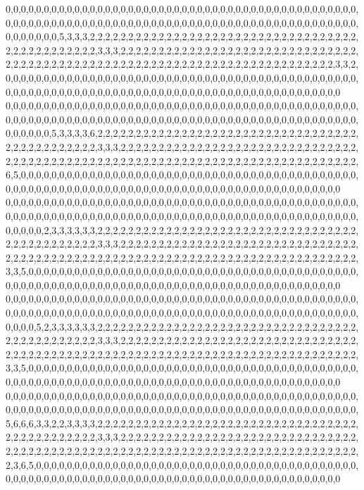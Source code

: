 0,0,0,0,0,0,0,0,0,0,0,0,0,0,0,0,0,0,0,0,0,0,0,0,0,0,0,0,0,0,0,0,0,0,0,0,0,0,0,0,0,0,0,0,0,0,0,0,0,0,0,0,0,0,0,0,0,0,0,0,0,0,0,0,0,0,0,0,0,0,0,0,0,0,0,0,0,0,0,0,0,0,0,0,0,0,0,0,0,0,0,0,0,0,0,0,0,0,0,5,3,3,3,2,2,2,2,2,2,2,2,2,2,2,2,2,2,2,2,2,2,2,2,2,2,2,2,2,2,2,2,2,2,2,2,2,2,2,2,2,2,2,2,2,2,2,2,2,2,2,3,3,3,2,2,2,2,2,2,2,2,2,2,2,2,2,2,2,2,2,2,2,2,2,2,2,2,2,2,2,2,2,2,2,2,2,2,2,2,2,2,2,2,2,2,2,2,2,2,2,2,2,2,2,2,2,2,2,2,2,2,2,2,2,2,2,2,2,2,2,2,2,2,2,2,2,2,3,3,2,0,0,0,0,0,0,0,0,0,0,0,0,0,0,0,0,0,0,0,0,0,0,0,0,0,0,0,0,0,0,0,0,0,0,0,0,0,0,0,0,0,0,0,0,0,0,0,0,0,0,0,0,0,0,0,0,0,0,0,0,0,0,0,0,0,0,0,0,0,0,0,0,0,0,0,0,0,0,0,0,0,0,0,0,0,0,0,0,0,0
0,0,0,0,0,0,0,0,0,0,0,0,0,0,0,0,0,0,0,0,0,0,0,0,0,0,0,0,0,0,0,0,0,0,0,0,0,0,0,0,0,0,0,0,0,0,0,0,0,0,0,0,0,0,0,0,0,0,0,0,0,0,0,0,0,0,0,0,0,0,0,0,0,0,0,0,0,0,0,0,0,0,0,0,0,0,0,0,0,0,0,0,0,0,0,0,0,0,5,3,3,3,3,6,2,2,2,2,2,2,2,2,2,2,2,2,2,2,2,2,2,2,2,2,2,2,2,2,2,2,2,2,2,2,2,2,2,2,2,2,2,2,2,2,2,2,2,2,2,2,3,3,3,2,2,2,2,2,2,2,2,2,2,2,2,2,2,2,2,2,2,2,2,2,2,2,2,2,2,2,2,2,2,2,2,2,2,2,2,2,2,2,2,2,2,2,2,2,2,2,2,2,2,2,2,2,2,2,2,2,2,2,2,2,2,2,2,2,2,2,2,2,2,2,2,2,2,2,2,2,6,5,0,0,0,0,0,0,0,0,0,0,0,0,0,0,0,0,0,0,0,0,0,0,0,0,0,0,0,0,0,0,0,0,0,0,0,0,0,0,0,0,0,0,0,0,0,0,0,0,0,0,0,0,0,0,0,0,0,0,0,0,0,0,0,0,0,0,0,0,0,0,0,0,0,0,0,0,0,0,0,0,0,0,0,0,0,0,0,0
0,0,0,0,0,0,0,0,0,0,0,0,0,0,0,0,0,0,0,0,0,0,0,0,0,0,0,0,0,0,0,0,0,0,0,0,0,0,0,0,0,0,0,0,0,0,0,0,0,0,0,0,0,0,0,0,0,0,0,0,0,0,0,0,0,0,0,0,0,0,0,0,0,0,0,0,0,0,0,0,0,0,0,0,0,0,0,0,0,0,0,0,0,0,0,0,0,2,3,3,3,3,3,3,2,2,2,2,2,2,2,2,2,2,2,2,2,2,2,2,2,2,2,2,2,2,2,2,2,2,2,2,2,2,2,2,2,2,2,2,2,2,2,2,2,2,2,2,2,2,3,3,3,2,2,2,2,2,2,2,2,2,2,2,2,2,2,2,2,2,2,2,2,2,2,2,2,2,2,2,2,2,2,2,2,2,2,2,2,2,2,2,2,2,2,2,2,2,2,2,2,2,2,2,2,2,2,2,2,2,2,2,2,2,2,2,2,2,2,2,2,2,2,2,2,2,2,2,2,2,3,3,5,0,0,0,0,0,0,0,0,0,0,0,0,0,0,0,0,0,0,0,0,0,0,0,0,0,0,0,0,0,0,0,0,0,0,0,0,0,0,0,0,0,0,0,0,0,0,0,0,0,0,0,0,0,0,0,0,0,0,0,0,0,0,0,0,0,0,0,0,0,0,0,0,0,0,0,0,0,0,0,0,0,0,0,0,0,0,0
0,0,0,0,0,0,0,0,0,0,0,0,0,0,0,0,0,0,0,0,0,0,0,0,0,0,0,0,0,0,0,0,0,0,0,0,0,0,0,0,0,0,0,0,0,0,0,0,0,0,0,0,0,0,0,0,0,0,0,0,0,0,0,0,0,0,0,0,0,0,0,0,0,0,0,0,0,0,0,0,0,0,0,0,0,0,0,0,0,0,0,0,0,0,0,0,5,2,3,3,3,3,3,3,2,2,2,2,2,2,2,2,2,2,2,2,2,2,2,2,2,2,2,2,2,2,2,2,2,2,2,2,2,2,2,2,2,2,2,2,2,2,2,2,2,2,2,2,2,2,3,3,3,2,2,2,2,2,2,2,2,2,2,2,2,2,2,2,2,2,2,2,2,2,2,2,2,2,2,2,2,2,2,2,2,2,2,2,2,2,2,2,2,2,2,2,2,2,2,2,2,2,2,2,2,2,2,2,2,2,2,2,2,2,2,2,2,2,2,2,2,2,2,2,2,2,2,2,2,2,3,3,5,0,0,0,0,0,0,0,0,0,0,0,0,0,0,0,0,0,0,0,0,0,0,0,0,0,0,0,0,0,0,0,0,0,0,0,0,0,0,0,0,0,0,0,0,0,0,0,0,0,0,0,0,0,0,0,0,0,0,0,0,0,0,0,0,0,0,0,0,0,0,0,0,0,0,0,0,0,0,0,0,0,0,0,0,0,0,0
0,0,0,0,0,0,0,0,0,0,0,0,0,0,0,0,0,0,0,0,0,0,0,0,0,0,0,0,0,0,0,0,0,0,0,0,0,0,0,0,0,0,0,0,0,0,0,0,0,0,0,0,0,0,0,0,0,0,0,0,0,0,0,0,0,0,0,0,0,0,0,0,0,0,0,0,0,0,0,0,0,0,0,0,0,0,0,0,0,0,0,0,5,6,6,6,3,3,2,2,3,3,3,3,2,2,2,2,2,2,2,2,2,2,2,2,2,2,2,2,2,2,2,2,2,2,2,2,2,2,2,2,2,2,2,2,2,2,2,2,2,2,2,2,2,2,2,2,2,2,3,3,3,2,2,2,2,2,2,2,2,2,2,2,2,2,2,2,2,2,2,2,2,2,2,2,2,2,2,2,2,2,2,2,2,2,2,2,2,2,2,2,2,2,2,2,2,2,2,2,2,2,2,2,2,2,2,2,2,2,2,2,2,2,2,2,2,2,2,2,2,2,2,2,2,2,2,2,2,2,2,3,6,5,0,0,0,0,0,0,0,0,0,0,0,0,0,0,0,0,0,0,0,0,0,0,0,0,0,0,0,0,0,0,0,0,0,0,0,0,0,0,0,0,0,0,0,0,0,0,0,0,0,0,0,0,0,0,0,0,0,0,0,0,0,0,0,0,0,0,0,0,0,0,0,0,0,0,0,0,0,0,0,0,0,0,0,0,0,0
